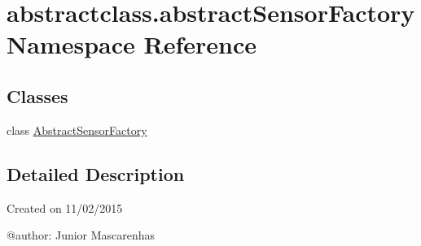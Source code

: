 \hypertarget{namespaceabstractclass_1_1abstractSensorFactory}{}\section{abstractclass.\+abstract\+Sensor\+Factory Namespace Reference}
\label{namespaceabstractclass_1_1abstractSensorFactory}
\subsection*{Classes}
\begin{DoxyCompactItemize}
\item 
class \hyperlink{classabstractclass_1_1abstractSensorFactory_1_1AbstractSensorFactory}{Abstract\+Sensor\+Factory}
\end{DoxyCompactItemize}


\subsection{Detailed Description}
\begin{DoxyVerb}Created on 11/02/2015

@author: Junior Mascarenhas
\end{DoxyVerb}
 